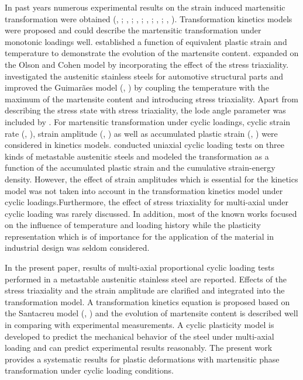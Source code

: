 \documentclass[final,5p,times,onecolumn,10pt,sort&compress]{elsarticle}
\begin{document}
In past years numerous experimental results on the strain induced martensitic transformation were obtained (\citeauthor{Angel}, \citeyear{Angel}; \citeauthor{Lecroisey1972Martensitic}, \citeyear{Lecroisey1972Martensitic}; \citeauthor{Olson1975Kinetics}, \citeyear{Olson1975Kinetics}; \citeauthor{Hecker1982Effects}, \citeyear{Hecker1982Effects}; \citeauthor{Diani1998Effects}, \citeyear{Diani1998Effects}; \citeauthor{Stringfellow1992A}, \citeyear{Stringfellow1992A}). Transformation kinetics models were proposed and could describe the martensitic transformation under monotonic loadings well. \cite{Olson1975Kinetics} established a function of equivalent plastic strain and temperature to demonstrate the evolution of the martensite content. \cite{Stringfellow1992A} expanded on the Olson and Cohen model by incorporating the effect of the stress triaxiality. \cite{Santacreu2006Behaviour} investigated the austenitic stainless steels for automotive structural parts and improved the Guimar{\~a}es model  (\citeauthor{Guimar1974Temperature}, \citeyear{Guimar1974Temperature}) by coupling the temperature with the maximum  of the martensite content and introducing stress triaxiality. Apart from describing the stress state with stress triaxiality, the lode angle parameter was included by \cite{Beese2011Effect}. For martensitic transformation under cyclic loadings, cyclic strain rate  (\citeauthor{Pegues2017Cyclic}, \citeyear{Pegues2017Cyclic}), strain amplitude  (\citeauthor{Wu2017Mechanical}, \citeyear{Wu2017Mechanical}) as well as accumulated plastic strain  (\citeauthor{Bayerlein1989Plasticity}, \citeyear{Bayerlein1989Plasticity}) were considered in kinetics models. \cite{Smaga2008Deformation} conducted uniaxial cyclic loading tests on three kinds of metastable austenitic steels and modeled the transformation as a function of the accumulated plastic strain and the cumulative strain-energy density. However, the effect of strain amplitudes which is essential for the kinetics model was not taken into account in the  transformation kinetics model under cyclic loadings.Furthermore, the effect of stress triaxiality for multi-axial under cyclic loading was rarely discussed. In addition, most of the known works focused on the influence of temperature and loading history while the plasticity representation which is of importance for the application of the material in industrial design was seldom considered.

In the present paper, results of multi-axial proportional cyclic loading tests performed in a metastable austenitic stainless steel are reported. Effects of the stress triaxiality and the strain amplitude are clarified  and integrated into the transformation model. A transformation kinetics equation is proposed based on the Santacreu model (\citeauthor{Santacreu2006Behaviour}, \citeyear{Santacreu2006Behaviour}) and the evolution of martensite content is described well in comparing with experimental measurements. A cyclic plasticity model is developed to predict the mechanical behavior of the steel under multi-axial loading and can predict experimental results reasonably. The present work provides a systematic results for plastic deformations with martensitic phase transformation under cyclic loading conditions.
\end{document}
